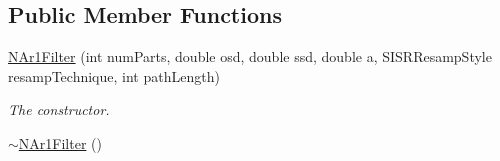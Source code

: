 \subsection*{Public Member Functions}
\begin{DoxyCompactItemize}
\item 
\hyperlink{classNAr1Filter_a98b2a069363ceb684abd8ae5c9d2b814}{N\+Ar1\+Filter} (int num\+Parts, double osd, double ssd, double a, S\+I\+S\+R\+Resamp\+Style resamp\+Technique, int path\+Length)
\begin{DoxyCompactList}\small\item\em The constructor. \end{DoxyCompactList}\item 
\hyperlink{classNAr1Filter_aee6f04f3144fb87edd42e641b134856b}{$\sim$\+N\+Ar1\+Filter} ()\hypertarget{classNAr1Filter_aee6f04f3144fb87edd42e641b134856b}{}\label{classNAr1Filter_aee6f04f3144fb87edd42e641b134856b}


\end{DoxyCompactItemize}
